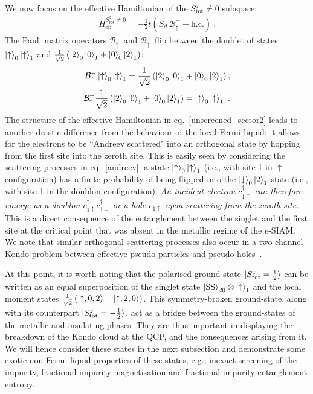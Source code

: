 \documentclass{iopart}
\begin{document}
We now focus on the effective Hamiltonian of the \(S^z_\text{tot} \neq 0\) subspace:
\begin{eqnarray}
	 H_\text{eff}^{S^z_\text{tot}\neq 0} = -\frac{1}{2}t\left(S_d^- \mathcal{B}^+_\uparrow + \text{h.c.}\right) \label{unscreened_sector2}~.
\end{eqnarray}
The Pauli matrix operators \(\mathcal{B}^+_\uparrow\) and \(\mathcal{B}^-_\uparrow\) flip between the doublet of states \(\ket{\uparrow}_0\ket{\uparrow}_1\) and \(\frac{1}{\sqrt 2}\left( \ket{2}_0\ket{0}_1 + \ket{0}_0\ket{2}_1 \right) \):
\begin{eqnarray}\label{andreev}
	\mathcal{B}^-_\uparrow\ket{\uparrow}_0\ket{\uparrow}_1 = \frac{1}{\sqrt 2}\left( \ket{2}_0\ket{0}_1 + \ket{0}_0\ket{2}_1 \right),\nonumber \\
	\mathcal{B}^+_\uparrow\frac{1}{\sqrt 2}\left( \ket{2}_0\ket{0}_1 + \ket{0}_0\ket{2}_1 \right) = \ket{\uparrow}_0\ket{\uparrow}_1~.
\end{eqnarray}
The structure of the effective Hamiltonian in eq.~\eqref{unscreened_sector2} leads to another drastic difference from the behaviour of the local Fermi liquid: it allows for the electrons to be ``Andreev scattered" into an orthogonal state by hopping from the first site into the zeroth site. This is easily seen by considering the scattering processes in eq.~\eqref{andreev}: a state \(\ket{\uparrow}_0\ket{\uparrow}_1\) (i.e., with site 1 in $\uparrow$ configuration) has a finite probability of being flipped into the \(\ket{\downarrow}_0\ket{2}_1\) state (i.e., with site 1 in the doublon configuration). {\it An incident electron \(c^\dagger_{1 \uparrow}\) can therefore emerge as a doublon \(c^\dagger_{1 \uparrow}c^\dagger_{1 \downarrow}\) or a hole \(c_{1 \uparrow}\) upon scattering from the zeroth site}. This is a direct consequence of the entanglement between the singlet and the first site at the critical point that was absent in the metallic regime of the e-SIAM. We note that similar orthogonal scattering processes also occur in a two-channel Kondo problem between effective pseudo-particles and pseudo-holes~\cite{von_delft_1998}.

At this point, it is worth noting that the polarised ground-state \(\ket{S_\text{tot}^z=\frac{1}{2}}\) can be written as an equal superposition of the singlet state \(\ket{\text{SS}}_{d0}\otimes\ket{\uparrow}_1\) and the local moment states \(\frac{1}{\sqrt 2}\left(\ket{\uparrow, 0, 2} - \ket{\uparrow, 2, 0}\right)\). This symmetry-broken ground-state, along with its counterpart $\ket{S_\text{tot}^z=-\frac{1}{2}}$, act as a bridge between the ground-states of the metallic and insulating phases. They are thus important in displaying the breakdown of the Kondo cloud at the QCP, and the consequences arising from it. We will hence consider these states in the next subsection and demonstrate some exotic non-Fermi liquid properties of these states, e.g., inexact screening of the impurity, fractional impurity magnetisation and fractional impurity entanglement entropy.
\end{document}
